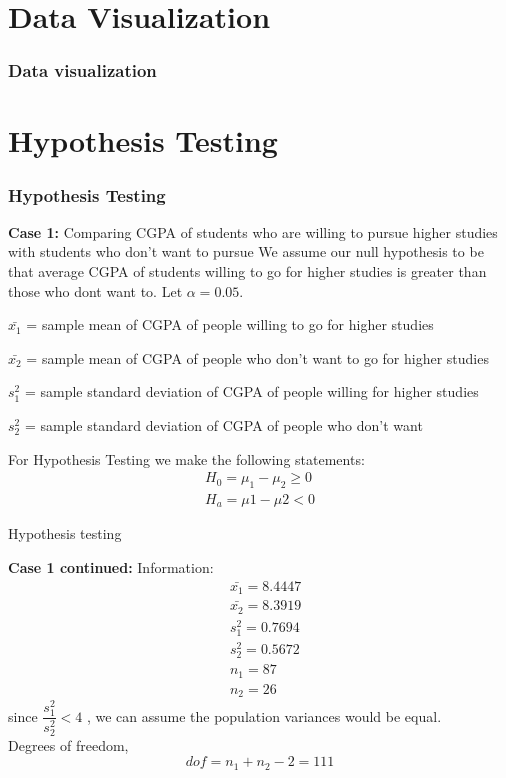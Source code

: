 \documentclass{beamer}
\begin{document}
\section{Data Visualization}
\begin{frame}
  \frametitle{Data visualization}
  
\end{frame}

\section{Hypothesis Testing}
\begin{frame}
  \frametitle{Hypothesis Testing}
  \begin{block}{\textbf{Case 1:}{ Comparing CGPA of students who are willing to pursue higher studies with students who don't want to pursue  }}
     We assume our null hypothesis to be that average CGPA of students willing to go for higher studies is  greater than those who dont want to. Let $\alpha = 0.05$.
     \begin{enumerate*}
         \item  $\bar{x_1}$ = sample mean of CGPA of people willing to go for higher studies\\
         \item  $\bar{x_2}$ = sample mean of CGPA of people who  don't want to go for higher studies\\
         \item  $s^2_1$ = sample standard deviation of CGPA of people willing for higher studies\\
         \item  $s^2_2$ = sample standard deviation of CGPA of people who  don't want \\
     \end{enumerate*}
   For Hypothesis Testing we make the following statements:
      \begin{align*}
          H_0=\mu_1-\mu_2\geq0\\
          H_a=\mu1-\mu2<0
      \end{align*}
        \end{block}
    \end{frame}
    \begin{frame}{Hypothesis testing}
        \begin{block}{\textbf{Case 1 continued:}}
            Information:
             \begin{align}
                 &\bar{x_1}=8.4447\\
                 &\bar{x_2}=8.3919\\
                 &s^2_1=0.7694\\
                 &s^2_2=0.5672\\
                 &n_1=87\\
                 &n_2=26
             \end{align}
       since $\dfrac{s^2_1}{s^2_2}<4$ , we can assume the population variances would be equal. \\
       Degrees of freedom, $$dof=n_1+n_2-2=111$$
        \end{block}
    \end{frame}
\end{document}

